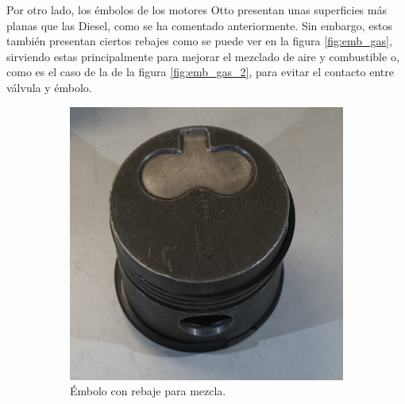 Por otro lado, los émbolos de los motores Otto presentan unas superficies más planas que las Diesel, como se ha comentado anteriormente. Sin embargo, estos también presentan ciertos rebajes como se puede ver en la figura \ref{fig:emb_gas}, sirviendo estas principalmente para mejorar el mezclado de aire y combustible o, como es el caso de la de la figura \ref{fig:emb_gas_2}, para evitar el contacto entre válvula y émbolo.

\begin{figure}[H]
	\centering
	\begin{subfigure}[b]{0.45\textwidth}
		\centering
		\includegraphics[width=\linewidth]{Figures/01/m1/cil_gas_1.jpg}
		\caption{Émbolo con rebaje para mezcla.}
		\label{fig:emb_gas_1}
	\end{subfigure}
	\hfill
	\begin{subfigure}[b]{0.45\textwidth}
 		\centering

\end{subfigure}
\end{figure}
